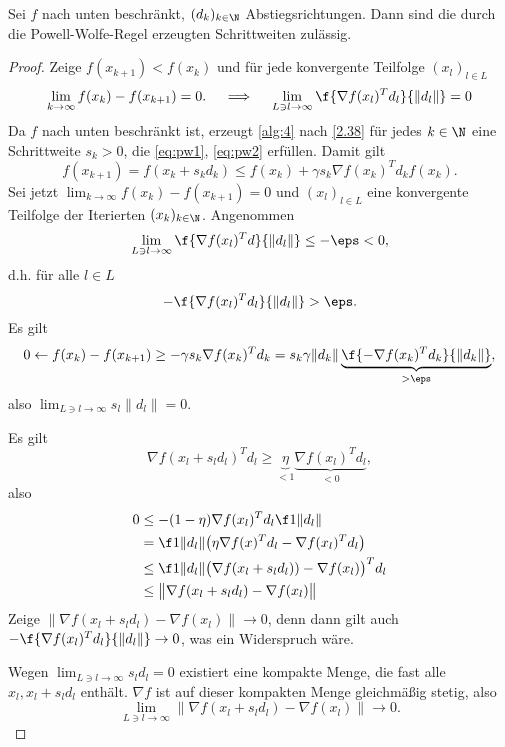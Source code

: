 \begin{st} \label{2.39}
	Sei $f$ nach unten beschränkt, $(d_k)_{k\in\N}$ Abstiegsrichtungen.
	Dann sind die durch die Powell-Wolfe-Regel erzeugten Schrittweiten zulässig.
	\begin{proof}
		Zeige $f(x_{k+1}) < f(x_k)$ und für jede konvergente Teilfolge $(x_l)_{l\in L}$
		\[
			\lim_{k\to\infty} f(x_k) - f(x_{k+1}) = 0.
			\quad\implies\quad
			\lim_{L\ni l \to\infty} \f{\nabla f(x_l)^T d_l}{\|d_l\|} = 0
		\]
		Da $f$ nach unten beschränkt ist, erzeugt \ref{alg:4} nach \ref{2.38} für jedes $k \in \N$ eine Schrittweite $s_k > 0$, die \ref{eq:pw1}, \ref{eq:pw2} erfüllen.
		Damit gilt
		\[
			f(x_{k+1})
			= f(x_k + s_k d_k)
			\le f(x_k) + \gamma s_k \nabla f(x_k)^T d_k
			f(x_k).
		\]
		Sei jetzt $\lim_{k\to\infty} f(x_k) - f(x_{k+1}) = 0$ und $(x_l)_{l\in L}$ eine konvergente Teilfolge der Iterierten $(x_k)_{k\in\N}$.
		Angenommen
		\[
			\lim_{L\ni l\to\infty} \f{\nabla f(x_l)^T d}{\|d_l\|} \le -\eps < 0,
		\]
		d.h. \oBdA für alle $l \in L$
		\[
			- \f {\nabla f(x_l)^T d_l}{\|d_l\|} > \eps.
		\]
		Es gilt
		\[
			0 \leftarrow
			f(x_k) - f(x_{k+1})
			\ge -\gamma s_k \nabla f(x_k)^T d_k
			= s_k \gamma \|d_k\| \underbrace{\f{-\nabla f(x_k)^T d_k}{\|d_k\|}}_{> \eps},
		\]
		also $\lim_{L\ni l\to\infty} s_l \|d_l\| = 0$.

		Es gilt
		\[
			\nabla f(x_l + s_l d_l)^T d_l \ge \underbrace{\eta}_{<1} \underbrace{\nabla f(x_l)^T d_l}_{<0},
		\]
		also
		\begin{align*}
			0
			&\le -(1-\eta)\nabla f(x_l)^T d_l \f 1{\|d_l\|} \\
			&= \f 1{\|d_l\|}\big( \eta \nabla f(x)^T d_l - \nabla f(x_l)^T d_l \big) \\
			&\le \f 1{\|d_l\|} \big( \nabla f(x_l + s_l d_l)) - \nabla f(x_l) \big)^T d_l \\
			&\le \big\|\nabla f(x_l + s_l d_l) -\nabla f(x_l) \big\|
		\end{align*}
		Zeige $\|\nabla f(x_l + s_l d_l) -\nabla f(x_l)\| \to 0$, denn dann gilt auch $- \f{\nabla f(x_l)^T d_l}{\|d_l\|} \to 0$, was ein Widerspruch wäre.

		Wegen $\lim_{L\ni l\to\infty} s_l d_l = 0$ existiert eine kompakte Menge, die fast alle $x_l, x_l + s_l d_l$ enthält.
		$\nabla f$ ist auf dieser kompakten Menge gleichmäßig stetig, also
		\[
			\lim_{L\ni l\to\infty} \big\|\nabla f(x_l + s_l d_l) -\nabla f(x_l) \big\| \to 0.
		\]
	\end{proof}
\end{st}


